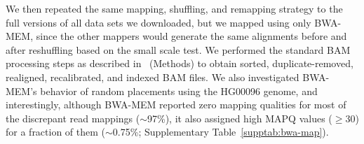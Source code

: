 \documentclass[10pt,a4paper]{article}
\begin{document}
We then repeated the same mapping, shuffling, and remapping strategy to the full versions of all data sets we downloaded, but we mapped using only BWA-MEM, since the other mappers 
would generate the same alignments before and after reshuffling based on the small scale test. We performed the standard BAM processing steps as described 
in~\cite{VanderAuwera2013} (Methods) to obtain sorted, duplicate-removed, realigned, recalibrated, and indexed BAM files. We also investigated BWA-MEM's behavior of random placements using the
HG00096 genome, and interestingly, although BWA-MEM reported zero mapping qualities for 
most of the discrepant read mappings ($\sim$97\%), it also assigned high MAPQ values ($\geq$30) for a fraction of them  ($\sim$0.75\%; Supplementary Table~\ref{supptab:bwa-map}). 


\end{document}
